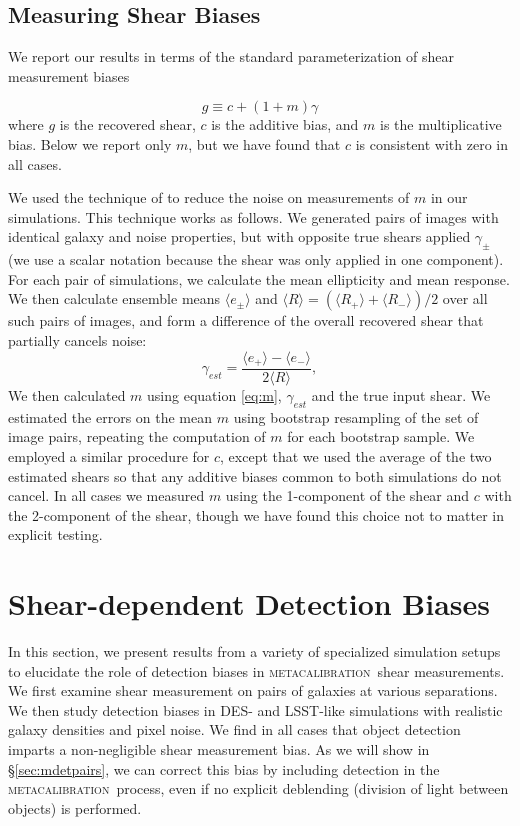 \documentclass[iop, appendixfloats, numberedappendix, apj]{emulateapj}
\newcommand{\mcal}{\textsc{metacalibration}}
\begin{document}
\subsection{Measuring Shear Biases}

We report our results in terms of the standard parameterization of shear
measurement biases \citep[see, e.g.,][]{heymans2006}

\begin{equation} \label{eq:m}
g \equiv c + (1 + m)\gamma
\end{equation}
where $g$ is the recovered shear, $c$ is the additive bias, and $m$ is the
multiplicative bias. Below we report only $m$, but we have found that $c$ is
consistent with zero in all cases.

We used the technique of \citet{pujol2019} to reduce the noise on measurements
of $m$ in our simulations.  This technique works as follows. We generated pairs
of images with identical galaxy and noise properties, but with opposite true
shears applied $\gamma_{\pm}$ (we use a scalar notation because the shear
was only applied in one component).  For each pair of simulations, we calculate the mean
ellipticity and mean response.  We then calculate ensemble means $\langle e_\pm \rangle$
and $\langle R \rangle = ( \langle R_+ \rangle + \langle R_- \rangle)/2$ over all such
pairs of images, and form a difference of the overall recovered shear that
partially cancels noise:
\begin{equation}
    \gamma_{est} = \frac{ \langle e_+ \rangle - \langle e_- \rangle}{2 \langle R \rangle},
\end{equation}
We then calculated $m$ using equation \ref{eq:m}, $\gamma_{est}$ and the true
input shear.  We estimated the errors on the mean $m$ using bootstrap
resampling of the set of image pairs, repeating the computation of $m$ for each
bootstrap sample. We employed a similar procedure for $c$, except that we used
the average of the two estimated shears so that any additive biases common to
both simulations do not cancel. In all  cases we measured $m$ using the
1-component of the shear and $c$ with the 2-component of the shear, though we
have found this choice not to matter in explicit testing.

\section{Shear-dependent Detection Biases}\label{sec:detbiases}

In this section, we present results from a variety of specialized simulation
setups to elucidate the role of detection biases in \mcal\ shear measurements.
We first examine shear measurement on pairs of galaxies at various separations.
We then study detection biases in DES- and LSST-like simulations with
realistic galaxy densities and pixel noise. We find in all cases that object
detection imparts a non-negligible shear measurement bias. As we will show in
\S \ref{sec:mdetpairs}, we can correct this bias by including detection in the
\mcal\ process, even if no explicit deblending (division of light between
objects) is performed.
\end{document}

